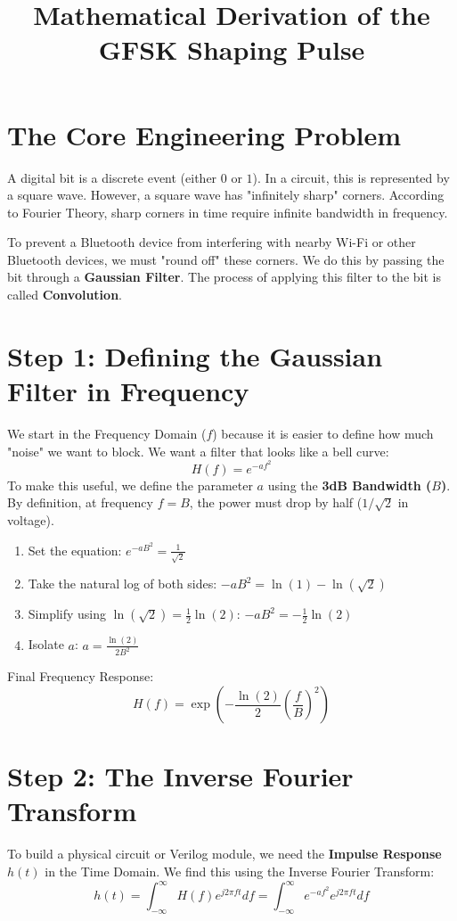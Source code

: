 \documentclass[12pt]{article}
\date{}
\begin{document}
\title{\textbf{Mathematical Derivation of the GFSK Shaping Pulse}}
\maketitle

\section{The Core Engineering Problem}
A digital bit is a discrete event (either $0$ or $1$). In a circuit, this is represented by a square wave. However, a square wave has "infinitely sharp" corners. According to Fourier Theory, sharp corners in time require infinite bandwidth in frequency. 

To prevent a Bluetooth device from interfering with nearby Wi-Fi or other Bluetooth devices, we must "round off" these corners. We do this by passing the bit through a \textbf{Gaussian Filter}. The process of applying this filter to the bit is called \textbf{Convolution}.

\section{Step 1: Defining the Gaussian Filter in Frequency}
We start in the Frequency Domain ($f$) because it is easier to define how much "noise" we want to block. We want a filter that looks like a bell curve:
\begin{equation}
H(f) = e^{-af^2}
\end{equation}
To make this useful, we define the parameter $a$ using the \textbf{3dB Bandwidth ($B$)}. By definition, at frequency $f = B$, the power must drop by half ($1/\sqrt{2}$ in voltage).
\begin{enumerate}
    \item Set the equation: $e^{-aB^2} = \frac{1}{\sqrt{2}}$
    \item Take the natural log of both sides: $-aB^2 = \ln(1) - \ln(\sqrt{2})$
    \item Simplify using $\ln(\sqrt{2}) = \frac{1}{2}\ln(2)$: $-aB^2 = -\frac{1}{2}\ln(2)$
    \item Isolate $a$: $a = \frac{\ln(2)}{2B^2}$
\end{enumerate}
Final Frequency Response:
\begin{equation}
H(f) = \exp\left( -\frac{\ln(2)}{2} \left( \frac{f}{B} \right)^2 \right)
\end{equation}

\section{Step 2: The Inverse Fourier Transform}
To build a physical circuit or Verilog module, we need the \textbf{Impulse Response} $h(t)$ in the Time Domain. We find this using the Inverse Fourier Transform:
\begin{equation}
h(t) = \int_{-\infty}^{\infty} H(f) e^{j2\pi ft} df = \int_{-\infty}^{\infty} e^{-af^2} e^{j2\pi ft} df
\end{equation}
\end{document}
